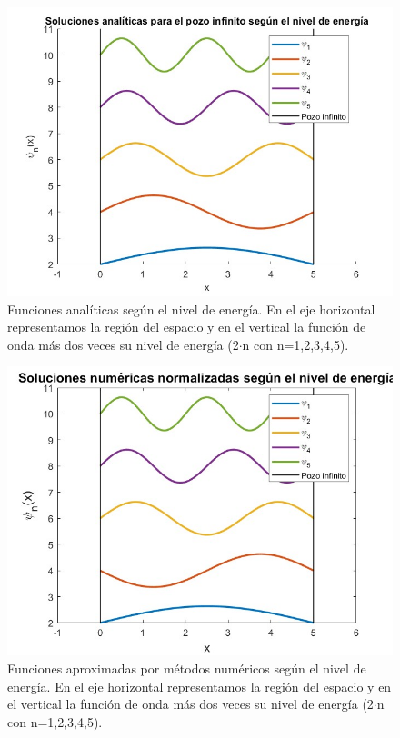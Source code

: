 \documentclass[12pt]{article}
\begin{document}
     \begin{figure}[H]
         \centering
         \includegraphics[width=1.05\linewidth]{fotos/infinito_analiticas.jpg}
         \caption{Funciones analíticas según el nivel de energía. En el eje horizontal representamos la región del espacio y en el vertical la función de onda más dos veces su nivel de energía (2$\cdot$n con n=1,2,3,4,5).}
     \end{figure}

     \begin{figure}[H]
         \centering
         \includegraphics[width=1.05\linewidth]{fotos/infinito_numericas.jpg}
         \caption{Funciones aproximadas por métodos numéricos según el nivel de energía. En el eje horizontal representamos la región del espacio y en el vertical la función de onda más dos veces su nivel de energía (2$\cdot$n con n=1,2,3,4,5).}
     \end{figure}
\end{document}
